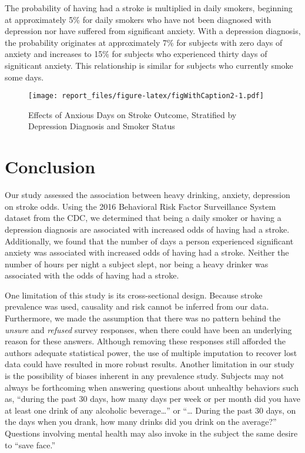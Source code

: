 \documentclass[11pt,]{article}
\begin{document}
The probability of having had a stroke is multiplied in daily smokers,
beginning at approximately 5\% for daily smokers who have not been
diagnosed with depression nor have suffered from significant anxiety.
With a depression diagnosis, the probability originates at approximately
7\% for subjects with zero days of anxiety and increases to 15\% for
subjects who experienced thirty days of signiticant anxiety. This
relationship is similar for subjects who currently smoke some days.

\begin{figure}
\centering
\texttt{[image: report\_files/figure-latex/figWithCaption2-1.pdf]}
\caption{Effects of Anxious Days on Stroke Outcome, Stratified by
Depression Diagnosis and Smoker Status}
\end{figure}

\section{Conclusion}\label{conclusion}

Our study assessed the association between heavy drinking, anxiety,
depression on stroke odds. Using the 2016 Behavioral Risk Factor
Surveillance System dataset from the CDC, we determined that being a
daily smoker or having a depression diagnosis are associated with
increased odds of having had a stroke. Additionally, we found that the
number of days a person experienced significant anxiety was associated
with increased odds of having had a stroke. Neither the number of hours
per night a subject slept, nor being a heavy drinker was associated with
the odds of having had a stroke.

One limitation of this study is its cross-sectional design. Because
stroke prevalence was used, causality and risk cannot be inferred from
our data. Furthermore, we made the assumption that there was no pattern
behind the \emph{unsure} and \emph{refused} survey responses, when there
could have been an underlying reason for these answers. Although
removing these responses still afforded the authors adequate statistical
power, the use of multiple imputation to recover lost data could have
resulted in more robust results. Another limitation in our study is the
possibility of biases inherent in any prevalence study. Subjects may not
always be forthcoming when answering questions about unhealthy behaviors
such as, ``during the past 30 days, how many days per week or per month
did you have at least one drink of any alcoholic beverage\ldots{}'' or
``\ldots{} During the past 30 days, on the days when you drank, how many
drinks did you drink on the average?'' Questions involving mental health
may also invoke in the subject the same desire to ``save face.''
\end{document}
